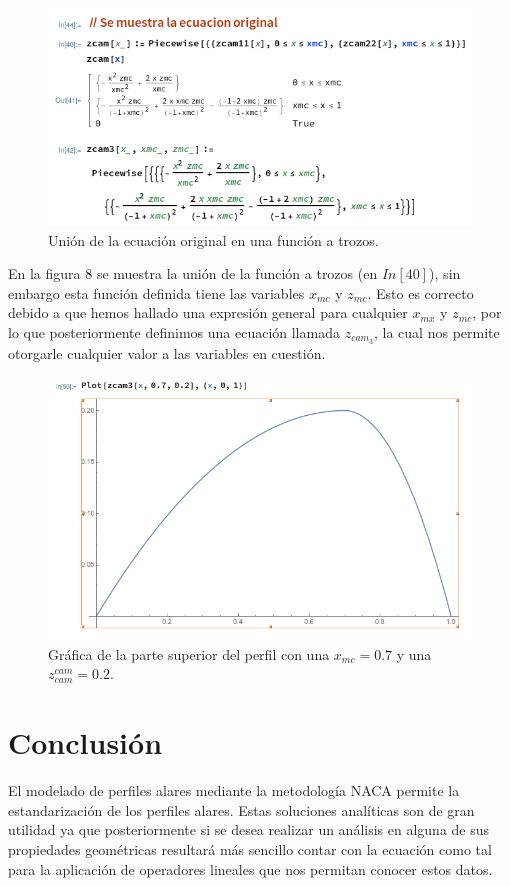 \documentclass[12pt, letterpaper]{article}
\begin{document}
\begin{figure}[H]
	\centering
	\includegraphics[width=\textwidth]{7.png}
	\caption{Unión de la ecuación original en una función a trozos.}
\end{figure}

En la figura 8 se muestra la unión de la función a trozos (en $In[40]$), sin embargo esta función definida tiene las variables $x_{mc}$ y $z_{mc}$. Esto es correcto debido a que hemos hallado una expresión general para cualquier $x_{mx}$ y $z_{mc}$, por lo que posteriormente definimos una ecuación llamada $z_{cam_3}$, la cual nos permite otorgarle cualquier valor a las variables en cuestión.

\begin{figure}[H]
	\centering
	\includegraphics[width=\textwidth]{8.png}
	\caption{Gráfica de la parte superior del perfil con una $x_{mc} = 0.7$ y una $z_{cam}^{cam} = 0.2$.}
\end{figure}

\section*{Conclusión}
El modelado de perfiles alares mediante la metodología NACA permite la estandarización de los perfiles alares. Estas soluciones analíticas son de gran utilidad ya que posteriormente si se desea realizar un análisis en alguna de sus propiedades geométricas resultará más sencillo contar con la ecuación como tal para la aplicación de operadores lineales que nos permitan conocer estos datos.
\end{document}
